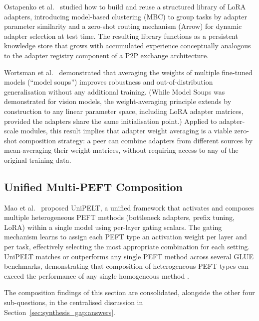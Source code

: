 Ostapenko et al.~\cite{Ostapenko2024} studied how to build and reuse a structured library of LoRA
adapters, introducing model-based clustering (MBC) to group tasks by adapter parameter
similarity and a zero-shot routing mechanism (Arrow) for dynamic adapter selection at
test time. The resulting library functions as a persistent knowledge store that
grows with accumulated experience conceptually analogous to the adapter registry
component of a P2P exchange architecture.

Wortsman et al.~\cite{Wortsman2022} demonstrated that averaging the weights of multiple fine-tuned
models (``model soups'') improves robustness and out-of-distribution generalisation
without any additional training. (While Model Soups was demonstrated for vision models,
the weight-averaging principle extends by construction to any linear parameter space,
including LoRA adapter matrices, provided the adapters share the same initialisation
point.) Applied to adapter-scale modules, this result implies
that adapter weight averaging is a viable zero-shot composition strategy: a peer can
combine adapters from different sources by mean-averaging their weight matrices,
without requiring access to any of the original training data.

\subsection{Unified Multi-PEFT Composition}
\label{sec:adapter_composition:unified}

Mao et al.~\cite{MaoUniPELT2022} proposed UniPELT, a unified framework that activates and
composes multiple heterogeneous PEFT methods (bottleneck adapters, prefix tuning, LoRA)
within a single model using per-layer gating scalars. The gating mechanism learns to
assign each PEFT type an activation weight per layer and per task, effectively selecting
the most appropriate combination for each setting. UniPELT matches or outperforms any
single PEFT method across several GLUE benchmarks\footnotemark, demonstrating that composition of
heterogeneous PEFT types can exceed the performance of any single homogeneous method
\cite{MaoUniPELT2022}.

\noindent The composition findings of this section are consolidated, alongside
the other four sub-questions, in the centralised discussion in
Section~\ref{sec:synthesis_gap:answers}.


